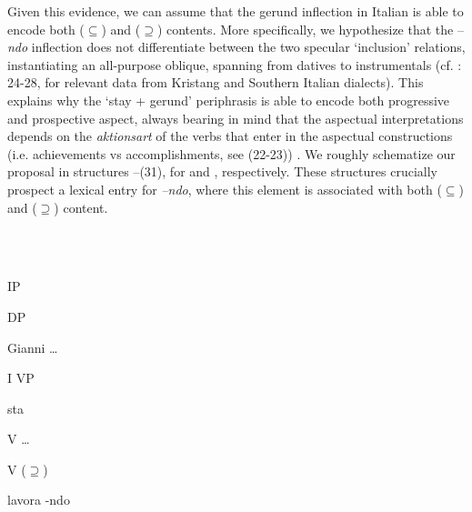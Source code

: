 \documentclass[output=paper,colorlinks,citecolor=brown]{./langscibook}
\begin{document}
Given this evidence, we can assume that the gerund inflection in Italian is able to encode both (${\subseteq}$) and (${\supseteq}$) contents. More specifically, we hypothesize that the –\textit{ndo} inflection does not differentiate between the two specular ‘inclusion’ relations, instantiating an all-purpose oblique, spanning from datives to instrumentals (cf. \citealt{FrancoManzini2017}: 24-28, for relevant data from Kristang and Southern Italian dialects). This explains why the ‘stay + gerund’ periphrasis is able to encode both progressive and prospective aspect, always bearing in mind that the aspectual interpretations depends on the \textit{aktionsart} of the verbs that enter in the aspectual constructions (i.e. achievements vs accomplishments, see (22-23)) . We roughly schematize our proposal in structures –(31), for  and , respectively. These structures crucially prospect a lexical entry for \textit{–ndo}, where this element is associated with both (${\subseteq}$) and (${\supseteq}$) content.

\ea%
    \label{ex:key:30}
    \gll\\
        \\
    \glt
    \z

                                                IP

                               

                            DP 

                          Gianni                                    …

                                             I                          VP

                                           sta

                                                          V                         …

                                                   

                                              V                      (${\supseteq}$)

                                           lavora                {}-ndo   

\ea%
    \label{ex:key:31}
    \gll\\
        \\
    \glt
    \z
\end{document}
